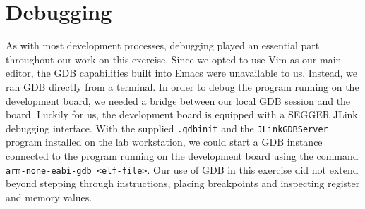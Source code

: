 \section{Debugging}

As with most development processes, debugging played an essential part throughout our work on this exercise. Since we opted to use Vim as our main editor, the GDB capabilities built into Emacs were unavailable to us. Instead, we ran GDB directly from a terminal. In order to debug the program running on the development board, we needed a bridge between our local GDB session and the board. Luckily for us, the development board is equipped with a SEGGER JLink debugging interface. With the supplied \texttt{.gdbinit} and the \texttt{JLinkGDBServer} program installed on the lab workstation, we could start a GDB instance connected to the program running on the development board using the command \texttt{arm-none-eabi-gdb <elf-file>}. Our use of GDB in this exercise did not extend beyond stepping through instructions, placing breakpoints and inspecting register and memory values. 

